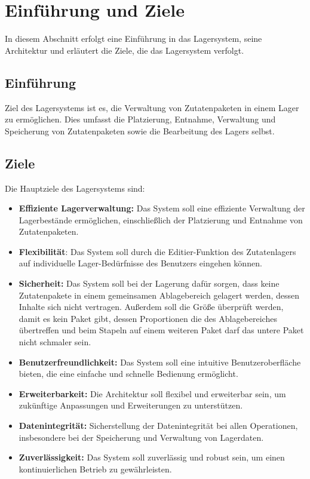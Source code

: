 \section{Einführung und Ziele}\label{sec: einfuehrung-und-ziele}
In diesem Abschnitt erfolgt eine Einführung in das Lagersystem, seine Architektur und erläutert die Ziele, die das Lagersystem verfolgt.

\subsection{Einführung}\label{subsec: einfuehrung}
Ziel des Lagersystems ist es, die Verwaltung von Zutatenpaketen in einem Lager zu ermöglichen. Dies umfasst die
Platzierung, Entnahme, Verwaltung und Speicherung von Zutatenpaketen sowie die Bearbeitung des Lagers selbst.

\subsection{Ziele}\label{subsec: ziele}
Die Hauptziele des Lagersystems sind:
\begin{itemize}
    \item \textbf{Effiziente Lagerverwaltung:} Das System soll eine effiziente Verwaltung der Lagerbestände ermöglichen, einschließlich der Platzierung und Entnahme von Zutatenpaketen.
    \item \textbf{Flexibilität}: Das System soll durch die Editier-Funktion des Zutatenlagers auf individuelle Lager-Bedürfnisse des Benutzers eingehen können.
    \item \textbf{Sicherheit:} Das System soll bei der Lagerung dafür sorgen, dass keine Zutatenpakete in einem gemeinsamen Ablagebereich gelagert werden, dessen Inhalte sich nicht vertragen. Außerdem soll die Größe überprüft werden, damit es kein Paket gibt, dessen Proportionen die des Ablagebereiches übertreffen und beim Stapeln auf einem weiteren Paket darf das untere Paket nicht schmaler sein.
    \item \textbf{Benutzerfreundlichkeit:} Das System soll eine intuitive Benutzeroberfläche bieten, die eine einfache und schnelle Bedienung ermöglicht.
    \item \textbf{Erweiterbarkeit:} Die Architektur soll flexibel und erweiterbar sein, um zukünftige Anpassungen und Erweiterungen zu unterstützen.
    \item \textbf{Datenintegrität:} Sicherstellung der Datenintegrität bei allen Operationen, insbesondere bei der Speicherung und Verwaltung von Lagerdaten.
    \item \textbf{Zuverlässigkeit:} Das System soll zuverlässig und robust sein, um einen kontinuierlichen Betrieb zu gewährleisten.
\end{itemize}

